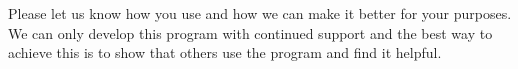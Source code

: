 Please let us know how you use \map{} and how we can make it better for
your purposes.  We can only develop this program with continued
support and the best way to achieve this is to show that others use the
program and find it helpful.



